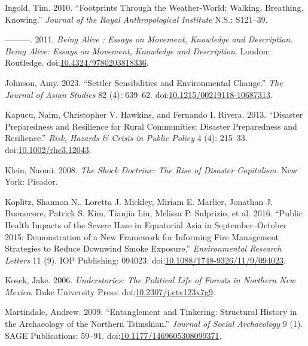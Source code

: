 \documentclass[
]{article}
\newlength{\cslhangindent}
\newenvironment{CSLReferences}[2] %
 {\begin{list}{}{%
  \setlength{\itemindent}{0pt}
  \setlength{\leftmargin}{0pt}
  \setlength{\parsep}{0pt}
  \ifodd #1
   \setlength{\leftmargin}{\cslhangindent}
   \setlength{\itemindent}{-1\cslhangindent}
  \fi
  \setlength{\itemsep}{#2\baselineskip}}}
 {\end{list}}
\begin{document}
\begin{CSLReferences}{1}{0}
Ingold, Tim. 2010. {``Footprints Through the Weather-World: Walking, Breathing, Knowing.''} \emph{Journal of the Royal Anthropological Institute} N.S.: S121--39.

---------. 2011. \emph{Being {Alive} : {Essays} on {Movement}, {Knowledge} and {Description}}. \emph{Being Alive: Essays on Movement, Knowledge and Description}. London: Routledge. doi:\href{https://doi.org/10.4324/9780203818336}{10.4324/9780203818336}.

Johnson, Amy. 2023. {``Settler {Sensibilities} and {Environmental Change}.''} \emph{The Journal of Asian Studies} 82 (4): 639--62. doi:\href{https://doi.org/10.1215/00219118-10687313}{10.1215/00219118-10687313}.

Kapucu, Naim, Christopher V. Hawkins, and Fernando I. Rivera. 2013. {``Disaster {Preparedness} and {Resilience} for {Rural Communities}: {Disaster Preparedness} and {Resilience}.''} \emph{Risk, Hazards \& Crisis in Public Policy} 4 (4): 215--33. doi:\href{https://doi.org/10.1002/rhc3.12043}{10.1002/rhc3.12043}.

Klein, Naomi. 2008. \emph{The Shock Doctrine: The Rise of Disaster Capitalism}. New York: Picador.

Koplitz, Shannon N., Loretta J. Mickley, Miriam E. Marlier, Jonathan J. Buonocore, Patrick S. Kim, Tianjia Liu, Melissa P. Sulprizio, et al. 2016. {``Public Health Impacts of the Severe Haze in {Equatorial Asia} in {September}--{October} 2015: Demonstration of a New Framework for Informing Fire Management Strategies to Reduce Downwind Smoke Exposure.''} \emph{Environmental Research Letters} 11 (9). IOP Publishing: 094023. doi:\href{https://doi.org/10.1088/1748-9326/11/9/094023}{10.1088/1748-9326/11/9/094023}.

Kosek, Jake. 2006. \emph{Understories: {The Political Life} of {Forests} in {Northern New Mexico}}. Duke University Press. doi:\href{https://doi.org/10.2307/j.ctv123x7g9}{10.2307/j.ctv123x7g9}.

Martindale, Andrew. 2009. {``Entanglement and Tinkering: {Structural} History in the Archaeology of the {Northern Tsimshian}.''} \emph{Journal of Social Archaeology} 9 (1). SAGE Publications: 59--91. doi:\href{https://doi.org/10.1177/1469605308099371}{10.1177/1469605308099371}.


\end{CSLReferences}
\end{document}
